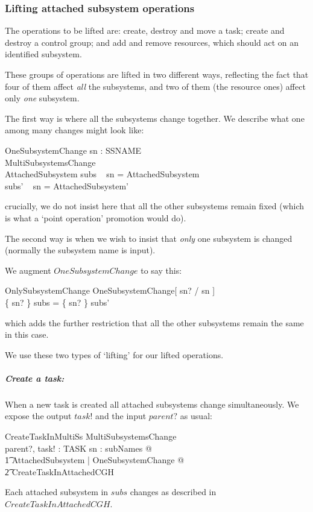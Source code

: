 \documentclass[a4paper,twoside,12pt]{article}
\begin{document}
\subsubsection{Lifting attached subsystem operations}

The operations to be lifted are: create,  destroy and move a task;
create and destroy a control group; and add and remove resources, which should act on an
identified subsystem.

These groups of operations are lifted in two different ways, reflecting the fact that four of them
affect \emph{all} the subsystems, and two of them (the resource ones) affect only \emph{one} subsystem.

The first way is where all the subsystems change together. We describe what one among many changes might look like:
\begin{schema}{OneSubsystemChange}
sn : SSNAME \\
MultiSubsystemsChange \\
\Delta AttachedSubsystem
\where
subs ~ sn = \theta AttachedSubsystem \\
subs' ~ sn = \theta AttachedSubsystem'
\end{schema}
crucially, we do not insist here that all the other subsystems remain fixed (which is what a `point operation' promotion would do).

The second way is when we wish to insist that \emph{only} one subsystem is changed (normally the subsystem name is input).

We augment
$OneSubsystemChange$ to say this:
\begin{schema}{OnlySubsystemChange}
OneSubsystemChange[ sn? / sn ] \\
\where
\{ sn? \} \ndres subs = \{ sn? \} \ndres subs' \\
\end{schema}
which adds the further restriction that all the other subsystems remain the same in this case.

We use these two types of `lifting' for our lifted operations.

\subparagraph{Create a task:}

When a new task is created all attached subsystems change simultaneously. We expose the output $task!$ and the input $parent?$ as usual:

\begin{schema}{CreateTaskInMultiSs}
MultiSubsystemsChange \\
parent?, task! : TASK
\where
\forall sn : subNames @ \\
\t1 \exists \Delta AttachedSubsystem | OneSubsystemChange @ \\
    \t2 CreateTaskInAttachedCGH
\end{schema}
Each attached subsystem in $subs$ changes as described in $CreateTaskInAttachedCGH$.
\end{document}
